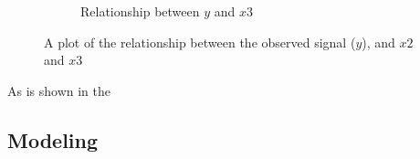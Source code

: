 \documentclass[12pt,a4paper,twoside]{article}
\begin{document}
\begin{figure}[!ht]
\begin{subfigure}{.45\textwidth}
        \caption{Relationship between $y$ and $x3$}
        \label{fig:y_x3_rel}
    \end{subfigure}
    \caption{A plot of the relationship between the observed signal ($y$), and $x2$ and $x3$}
    \label{fig:ydummycovariatesfig}
\end{figure}

As is shown in the 

\subsection{Modeling}
\label{ssec:modeling}
\end{document}
